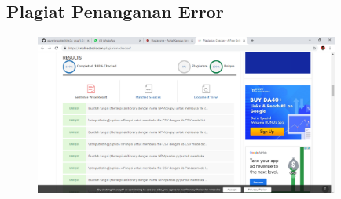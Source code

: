 \subsection{Plagiat Penanganan Error}
\begin{figure}[H]
	\includegraphics[width=10cm]{figures/4/1174089/Praktek/plagiatpenanganan.png}
	\centering
\end{figure}
